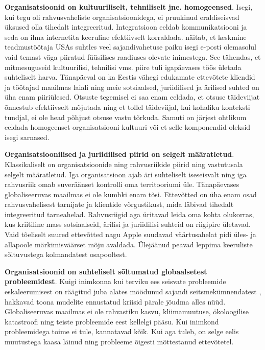 \documentclass{tufte-book}
\begin{document}
\textbf{Organisatsioonid on kultuuriliselt, tehniliselt jne. homogeensed}. Isegi, kui tegu oli rahvusvaheliste organisatsioonidega, ei pruukinud eraldiseisvad üksused olla tihedalt integreeritud. Integratsioon eeldab kommunikatsiooni ja seda on ilma internetita keeruline efektiivselt korraldada. \citeauthor{cfmcommnetworks}\cite{cfmcommnetworks} näitab, et keskmine teadmustöötaja USAs suhtles veel sajandivahetuse paiku isegi e-posti olemasolul vaid temast väga piiratud füüsilises raadiuses olevate inimestega. See tähendas, et mitmesuguseid kultuurilisi, tehnilisi vms. piire tuli igapäevases töös ületada suhteliselt harva. Tänapäeval on ka Eestis vähegi edukamate ettevõtete kliendid ja töötajad maailmas laiali ning meie sotsiaalsed, juriidilised ja ärilised suhted on üha enam piiriülesed. Otsuste tegemisel ei saa enam eeldada, et otsuse täideviijat õnnestub efektiivselt mõjutada ning et tollel täideviijal, kui kohaliku konteksti tundjal, ei ole head põhjust otsuse vastu tõrkuda. Samuti on järjest ohtlikum eeldada homogeenset organisatsiooni kultuuri või et selle komponendid oleksid isegi sarnased.

\textbf{Organisatsioonilised ja juriidilised piirid on selgelt määratletud}. Klassikaliselt on organisatsioonide ning rahvusriikide piirid ning vastutusala selgelt määratletud. Iga organisatsioon ajab äri suhteliselt iseseisvalt ning iga rahvusriik omab suveräänset kontrolli oma territooriumi üle. Tänapäevases globaliseeruvas maailmas ei ole kumbki enam tõsi. Ettevõtted on üha enam osad rahvusvahelisest tarnijate ja klientide võrgustikust, mida läbivad tihedalt integreeritud tarneahelad. Rahvusriigid aga üritavad leida oma kohta olukorras, kus kriitiline mass sotsiaalseid, ärilisi ja juriidilisi suhteid on riigipire ületavad. Vaid tõeliselt suured ettevõtted nagu Apple suudavad väärtusahelat pidi üles- ja allapoole märkimisväärset mõju avaldada. Ülejäänud peavad leppima keeruliste sõltuvustega kolmandatest osapooltest. 

\textbf{Organisatsioonid on suhteliselt sõltumatud globaalsetest probleemidest}. Kuigi inimkonna kui terviku ees seisvate probleemide eskaleerumisest on räägitud juba alates möödunud sajandi seitsmekümnendatest \cite{forrester1971world}, hakkavad toona mudelite ennustatud kriisid pärale jõudma alles nüüd. Globaliseeruvas maailmas ei ole rahvastiku kasvu, kliimamuutuse, ökoloogilise katastroofi ning teiste probleemide eest kellelgi pääsu. Kui inimkond probleemidega toime ei tule, kannatavad kõik. Kui aga tuleb, on selge eelis muutustega kaasa läinud ning probleeme õigesti mõttestanud ettevõtetel. 
\end{document}
